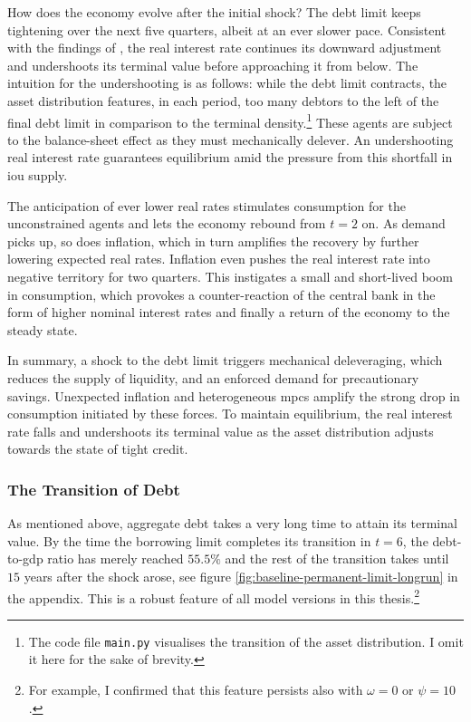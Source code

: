 \documentclass[a4paper,12pt]{article} %
\numberwithin{equation}{section} %
\numberwithin{figure}{section}
\numberwithin{table}{section}
\begin{document}
How does the economy evolve after the initial shock? The debt limit keeps tightening over the next five quarters, albeit at an ever slower pace. Consistent with the findings of \textcite{gl2017}, the real interest rate continues its downward adjustment and undershoots its terminal value before approaching it from below. The intuition for the undershooting is as follows: while the debt limit contracts, the asset distribution features, in each period, too many debtors to the left of the final debt limit in comparison to the terminal density.\footnote{The code file \texttt{main.py} visualises the transition of the asset distribution. I omit it here for the sake of brevity.} These agents are subject to the balance-sheet effect as they must mechanically delever. An undershooting real interest rate guarantees equilibrium amid the pressure from this shortfall in \Gls{iou} supply.

The anticipation of ever lower real rates stimulates consumption for the unconstrained agents and lets the economy rebound from $t=2$ on. As demand picks up, so does inflation, which in turn amplifies the recovery by further lowering expected real rates. Inflation even pushes the real interest rate into negative territory for two quarters. This instigates a small and short-lived boom in consumption, which provokes a counter-reaction of the central bank in the form of higher nominal interest rates and finally a return of the economy to the steady state.

In summary, a shock to the debt limit triggers mechanical deleveraging, which reduces the supply of liquidity, and an enforced demand for precautionary savings. Unexpected inflation and heterogeneous \Gls{mpc}s amplify the strong drop in consumption initiated by these forces. To maintain equilibrium, the real interest rate falls and undershoots its terminal value as the asset distribution adjusts towards the state of tight credit.

\subsubsection{The Transition of Debt}
\label{sec:limit-transition-debt}

As mentioned above, aggregate debt takes a very long time to attain its terminal value. By the time the borrowing limit completes its transition in $t=6$, the debt-to-\Gls{gdp} ratio has merely reached $55.5\%$ and the rest of the transition takes until $15$ years after the shock arose, see figure \ref{fig:baseline-permanent-limit-longrun} in the appendix. This is a robust feature of all model versions in this thesis.\footnote{For example, I confirmed that this feature persists also with $\omega = 0$ or $\psi = 10$.}
\end{document}
